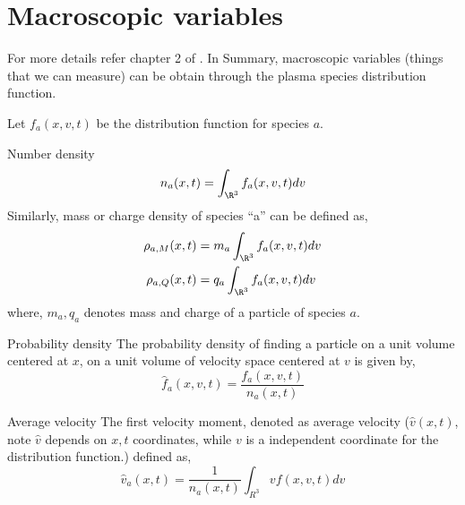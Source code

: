 \section{Macroscopic variables}
\label{sec:plasma_macroscopic_vars}

For more details refer chapter 2 of \cite{howard}. In Summary, macroscopic variables (things that we can measure) can be obtain through the plasma species distribution function. 

Let $f_a(x,v,t)$ be the distribution function for species $a$. 
\begin{definition}{Number density}
    \begin{equation}
        n_a(x,t) = \int_{\R^3} f_a(x,v,t) dv 
    \end{equation}
Similarly, mass or charge density of species ``a'' can be defined as, 
\begin{align}
    \rho_{a,M}(x,t)   &= m_a \int_{\R^3} f_a(x,v,t) dv \\
    \rho_{a,Q}(x,t) &= q_a \int_{\R^3} f_a(x,v,t) dv 
\end{align} where, $m_a,q_a$ denotes mass and charge of a particle of species $a$. 
\end{definition}

\begin{definition}{Probability density}
    The probability density of finding a particle on a unit volume centered at $x$, on a unit volume of velocity space centered at $v$ is given by, 
    \begin{equation}
        \hat{f}_a(x,v,t) = \frac{f_a(x,v,t)}{n_a(x,t)}
    \end{equation}
\end{definition}

\begin{definition}{Average velocity}
    The first velocity moment, denoted as average velocity ($\hat{v}(x,t)$, note $\hat{v}$ depends on $x,t$ coordinates, while $v$ is a independent coordinate for the distribution function.) defined as, 
    \begin{equation}
        \hat{v}_a(x,t) = \frac{1}{n_a(x,t)} \int_{R^3} v f(x,v,t) dv
    \end{equation}
\end{definition}